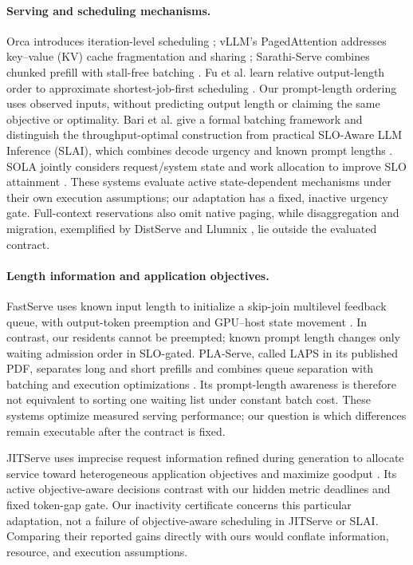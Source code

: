 \paragraph{Serving and scheduling mechanisms.}
Orca introduces iteration-level scheduling \citep{yu2022orca}; vLLM's
PagedAttention addresses key--value (KV) cache fragmentation and sharing \citep{kwon2023vllm};
Sarathi-Serve combines chunked prefill with stall-free batching
\citep{agrawal2024sarathi}. Fu et al. learn relative output-length order to
approximate shortest-job-first scheduling \citep{fu2024ranking}. Our
prompt-length ordering uses observed inputs, without predicting output
length or claiming the same objective or optimality.
Bari et al. give a formal batching framework and distinguish the
throughput-optimal construction from practical SLO-Aware LLM Inference
(SLAI), which combines
decode urgency and known prompt lengths
\citep{slai2025}. SOLA jointly considers request/system state and work
allocation to improve SLO attainment \citep{hong2025sola}. These systems evaluate active state-dependent mechanisms under their own
execution assumptions; our adaptation has a fixed, inactive urgency gate. Full-context reservations also omit native paging, while
disaggregation and migration, exemplified by DistServe and Llumnix
\citep{zhong2024distserve,sun2024llumnix}, lie outside the evaluated contract.

\paragraph{Length information and application objectives.}
FastServe uses known input length to initialize a skip-join multilevel
feedback queue, with output-token preemption and GPU--host state movement
\citep{wu2026fastserve}. In contrast, our residents cannot be preempted;
known prompt length changes only waiting admission order in SLO-gated.
PLA-Serve, called LAPS in its published PDF, separates long and short
prefills and combines queue separation with batching and execution
optimizations \citep{she2026plaserve}. Its prompt-length awareness is
therefore not equivalent to sorting one waiting list under constant batch
cost. These systems optimize measured serving performance; our question
is which differences remain executable after the contract is fixed.

JITServe uses imprecise request information refined during generation to
allocate service toward heterogeneous application objectives and maximize
goodput \citep{zhang2026jitserve}. Its active objective-aware decisions
contrast with our hidden metric deadlines and fixed token-gap gate.
Our inactivity certificate concerns this particular adaptation, not a
failure of objective-aware scheduling in JITServe or SLAI. Comparing their
reported gains directly with ours would conflate information, resource,
and execution assumptions.

